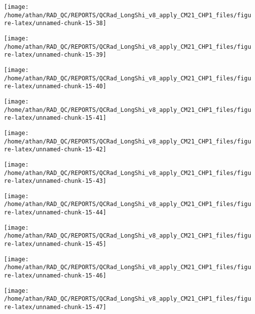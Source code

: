 \documentclass[
  10pt,
  a4paper,oneside]{article}
\begin{document}
\begin{center}\texttt{[image: /home/athan/RAD\_QC/REPORTS/QCRad\_LongShi\_v8\_apply\_CM21\_CHP1\_files/figure-latex/unnamed-chunk-15-38]} \end{center}

\begin{center}\texttt{[image: /home/athan/RAD\_QC/REPORTS/QCRad\_LongShi\_v8\_apply\_CM21\_CHP1\_files/figure-latex/unnamed-chunk-15-39]} \end{center}

\begin{center}\texttt{[image: /home/athan/RAD\_QC/REPORTS/QCRad\_LongShi\_v8\_apply\_CM21\_CHP1\_files/figure-latex/unnamed-chunk-15-40]} \end{center}

\begin{center}\texttt{[image: /home/athan/RAD\_QC/REPORTS/QCRad\_LongShi\_v8\_apply\_CM21\_CHP1\_files/figure-latex/unnamed-chunk-15-41]} \end{center}

\begin{center}\texttt{[image: /home/athan/RAD\_QC/REPORTS/QCRad\_LongShi\_v8\_apply\_CM21\_CHP1\_files/figure-latex/unnamed-chunk-15-42]} \end{center}

\begin{center}\texttt{[image: /home/athan/RAD\_QC/REPORTS/QCRad\_LongShi\_v8\_apply\_CM21\_CHP1\_files/figure-latex/unnamed-chunk-15-43]} \end{center}

\begin{center}\texttt{[image: /home/athan/RAD\_QC/REPORTS/QCRad\_LongShi\_v8\_apply\_CM21\_CHP1\_files/figure-latex/unnamed-chunk-15-44]} \end{center}

\begin{center}\texttt{[image: /home/athan/RAD\_QC/REPORTS/QCRad\_LongShi\_v8\_apply\_CM21\_CHP1\_files/figure-latex/unnamed-chunk-15-45]} \end{center}

\begin{center}\texttt{[image: /home/athan/RAD\_QC/REPORTS/QCRad\_LongShi\_v8\_apply\_CM21\_CHP1\_files/figure-latex/unnamed-chunk-15-46]} \end{center}

\begin{center}\texttt{[image: /home/athan/RAD\_QC/REPORTS/QCRad\_LongShi\_v8\_apply\_CM21\_CHP1\_files/figure-latex/unnamed-chunk-15-47]} \end{center}
\end{document}

